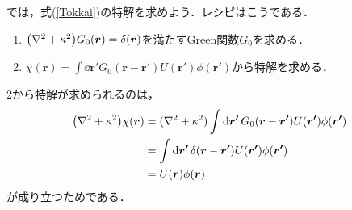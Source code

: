 \documentclass{report}
\begin{document}
  では，式(\ref{Tokkai})の特解を求めよう．レシピはこうである．
  \begin{enumerate}
    \item $\qty(\nabla^2 + \kappa^2)G_0(\bm{r}) = \delta(\bm{r})$を満たすGreen関数$G_0$を求める．
    \item $\chi(\bm{r}) = \int \dd{\bm{r'}} G_0(\bm{r} - \bm{r'}) U(\bm{r'}) \phi(\bm{r'})$から特解を求める．
  \end{enumerate}
  2から特解が求められるのは，
  \begin{align}
    \qty(\nabla^2 + \kappa^2)\chi(\bm{r}) &= (\nabla^2 + \kappa^2)\int \dd{\bm{r'}} G_0(\bm{r} - \bm{r'}) U(\bm{r'}) \phi(\bm{r'})\\
    &= \int \dd{\bm{r'}} \delta(\bm{r} - \bm{r'}) U(\bm{r'}) \phi(\bm{r'})\\
    &= U(\bm{r}) \phi(\bm{r})
  \end{align}
  が成り立つためである．
\end{document}
